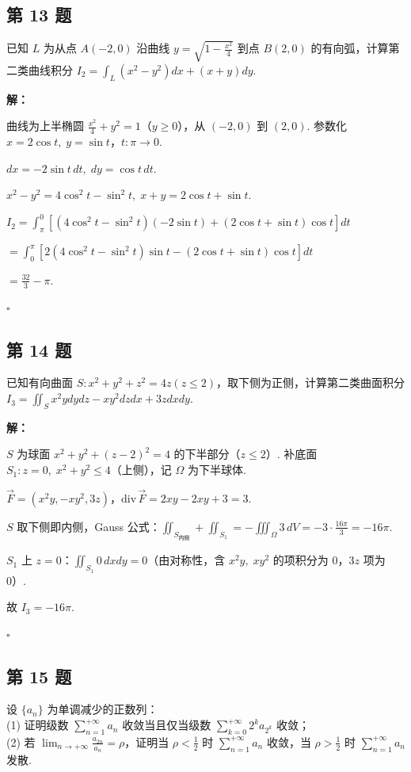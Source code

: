 \documentclass[12pt,a4paper]{article}
\newenvironment{sol}[1][解]{%
  \par\medskip\noindent\textbf{#1：}\itshape\par\noindent\ignorespaces
}{%
  \par\hfill$\square$\par\medskip
}
\begin{document}
\subsection*{第 13 题}
已知 $L$ 为从点 $A(-2,0)$ 沿曲线 $y=\sqrt{1-\frac{x^2}{4}}$ 到点 $B(2,0)$
的有向弧，计算第二类曲线积分 $I_2=\int_{L}(x^2-y^2)dx+(x+y)dy$.

\begin{sol}曲线为上半椭圆 $\frac{x^2}{4}+y^2=1$（$y\ge 0$），从 $(-2,0)$ 到
  $(2,0)$. 参数化 $x=2\cos t,\; y=\sin t$，$t:\pi\to 0$.

  $dx=-2\sin t\,dt,\; dy=\cos t\,dt$.

  $x^2-y^2=4\cos^2 t-\sin^2 t,\; x+y=2\cos t+\sin t$.

  $I_2=\int_{\pi}^0[(4\cos^2 t-\sin^2 t)(-2\sin t)+(2\cos t+\sin t)\cos t]dt$

  $=\int_0^{\pi}[2(4\cos^2 t-\sin^2 t)\sin t-(2\cos t+\sin t)\cos t]dt$

  $=\frac{32}{3}-\pi.$

\end{sol}
\subsection*{第 14 题}
已知有向曲面 $S: x^2+y^2+z^2=4z (z\le 2)$，取下侧为正侧，计算第二类曲面积分
$I_3=\iint_{S}x^2ydydz-xy^2dzdx+3zdxdy$.

\begin{sol}$S$ 为球面 $x^2+y^2+(z-2)^2=4$ 的下半部分（$z\le 2$）. 补底面 $S_1:
  z=0,\; x^2+y^2\le 4$（上侧），记 $\Omega$ 为下半球体.

  $\vec{F}=(x^2y,-xy^2,3z)$，$\text{div}\,\vec{F}=2xy-2xy+3=3$.

  $S$ 取下侧即内侧，Gauss
  公式：$\iint_{S_{\text{内侧}}}+\iint_{S_1}=-\iiint_{\Omega}3\,dV=-3\cdot\frac{16\pi}{3}=-16\pi$.

  $S_1$ 上 $z=0$：$\iint_{S_1}0\,dxdy=0$（由对称性，含 $x^2y,\; xy^2$ 的项积分为 0，$3z$ 项为 0）.

  故 $I_3=-16\pi.$

\end{sol}
\subsection*{第 15 题}
设 $\{a_n\}$ 为单调减少的正数列：\\
(1) 证明级数 $\sum_{n=1}^{+\infty}a_n$ 收敛当且仅当级数
$\sum_{k=0}^{+\infty}2^ka_{2^k}$ 收敛；\\
(2) 若 $\lim_{n\rightarrow+\infty}\frac{a_{2n}}{a_n}=\rho$，证明当
$\rho<\frac{1}{2}$ 时 $\sum_{n=1}^{+\infty}a_n$ 收敛，当
$\rho>\frac{1}{2}$ 时 $\sum_{n=1}^{+\infty}a_n$ 发散.
\end{document}
